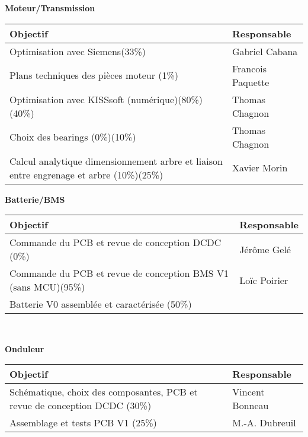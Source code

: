 \textbf{\large Moteur/Transmission}\\
\begin{tabularx}{\linewidth}{
    |>{\hsize=1.75\hsize}X|%
    >{\hsize=0.25\hsize}X|%
  }
    \hline
    \textbf{Objectif} & \textbf{Responsable} \\\hline
     Optimisation avec Siemens(33\%)  & Gabriel Cabana \\\hline
     Plans techniques des pièces moteur (1\%)  & Francois Paquette \\\hline
     Optimisation avec KISSsoft (numérique)(80\%)(40\%)  &  Thomas Chagnon\\\hline
     Choix des bearings (0\%)(10\%)  &  Thomas Chagnon\\\hline
     Calcul analytique dimensionnement arbre et liaison entre engrenage et arbre (10\%)(25\%) & Xavier Morin\\\hline
\end{tabularx}
\medskip

\textbf{\large Batterie/BMS}
\\
\begin{tabularx}{\linewidth}{
    |>{\hsize=1.75\hsize}X|%
    >{\hsize=0.25\hsize}X|%
  }
    \hline
    \textbf{Objectif} & \textbf{Responsable} \\\hline
    Commande du PCB et revue de conception DCDC (0\%)  & Jérôme Gelé \\\hline 
    Commande du PCB et revue de conception BMS V1 (sans MCU)(95\%) & Loïc Poirier\\\hline
    Batterie V0 assemblée et caractérisée (50\%)
\end{tabularx}\\
\medskip

\textbf{\large Onduleur}\\
\begin{tabularx}{\linewidth}{
    |>{\hsize=1.75\hsize}X|%
    >{\hsize=0.25\hsize}X|%
  }
    \hline
    \textbf{Objectif} & \textbf{Responsable} \\\hline
    Schématique, choix des composantes, PCB et revue de conception DCDC (30\%)  & Vincent Bonneau \\\hline
     Assemblage et tests PCB V1 (25\%) & M.-A. Dubreuil\\\hline
\end{tabularx}
\medskip

